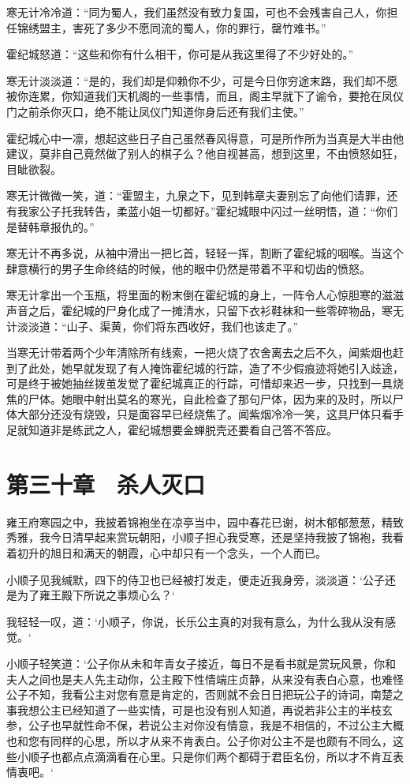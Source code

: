寒无计冷冷道：“同为蜀人，我们虽然没有致力复国，可也不会残害自己人，你担任锦绣盟主，害死了多少不愿同流的蜀人，你的罪行，罄竹难书。”

霍纪城怒道：“这些和你有什么相干，你可是从我这里得了不少好处的。”

寒无计淡淡道：“是的，我们却是仰赖你不少，可是今日你穷途末路，我们却不愿被你连累，你知道我们天机阁的一些事情，而且，阁主早就下了谕令，要抢在凤仪门之前杀你灭口，绝不能让凤仪门知道你身后还有我们主使。”

霍纪城心中一凛，想起这些日子自己虽然春风得意，可是所作所为当真是大半由他建议，莫非自己竟然做了别人的棋子么？他自视甚高，想到这里，不由愤怒如狂，目眦欲裂。

寒无计微微一笑，道：“霍盟主，九泉之下，见到韩章夫妻别忘了向他们请罪，还有我家公子托我转告，柔蓝小姐一切都好。”霍纪城眼中闪过一丝明悟，道：“你们是替韩章报仇的。”

寒无计不再多说，从袖中滑出一把匕首，轻轻一挥，割断了霍纪城的咽喉。当这个肆意横行的男子生命终结的时候，他的眼中仍然是带着不平和切齿的愤怒。

寒无计拿出一个玉瓶，将里面的粉末倒在霍纪城的身上，一阵令人心惊胆寒的滋滋声音之后，霍纪城的尸身化成了一摊清水，只留下衣衫鞋袜和一些零碎物品，寒无计淡淡道：“山子、渠黄，你们将东西收好，我们也该走了。”

当寒无计带着两个少年清除所有线索，一把火烧了农舍离去之后不久，闻紫烟也赶到了此处，她早就发现了有人掩饰霍纪城的行踪，造了不少假痕迹将她引入歧途，可是终于被她抽丝拨茧发觉了霍纪城真正的行踪，可惜却来迟一步，只找到一具烧焦的尸体。她眼中射出莫名的寒光，自此检查了那句尸体，因为来的及时，所以尸体大部分还没有烧毁，只是面容早已经烧焦了。闻紫烟冷冷一笑，这具尸体只看手足就知道非是练武之人，霍纪城想要金蝉脱壳还要看自己答不答应。

\chapter{第三十章　杀人灭口}

雍王府寒园之中，我披着锦袍坐在凉亭当中，园中春花已谢，树木郁郁葱葱，精致秀雅，我今日清早起来赏玩朝阳，小顺子担心我受寒，还是坚持我披了锦袍，我看着初升的旭日和满天的朝霞，心中却只有一个念头，一个人而已。

小顺子见我缄默，四下的侍卫也已经被打发走，便走近我身旁，淡淡道：‘公子还是为了雍王殿下所说之事烦心么？‘

我轻轻一叹，道：‘小顺子，你说，长乐公主真的对我有意么，为什么我从没有感觉。‘

小顺子轻笑道：‘公子你从未和年青女子接近，每日不是看书就是赏玩风景，你和夫人之间也是夫人先主动你，公主殿下性情端庄贞静，从来没有表白心意，也难怪公子不知，我看公主对您有意是肯定的，否则就不会日日把玩公子的诗词，南楚之事我想公主已经知道了一些实情，可是也没有别人知道，再说若非公主的半枝玄参，公子也早就性命不保，若说公主对你没有情意，我是不相信的，不过公主大概也和您有同样的心思，所以才从来不肯表白。公子你对公主不是也颇有不同么，这些小顺子也都点点滴滴看在心里。只是你们两个都碍于君臣名份，所以才不肯互表情衷吧。‘

